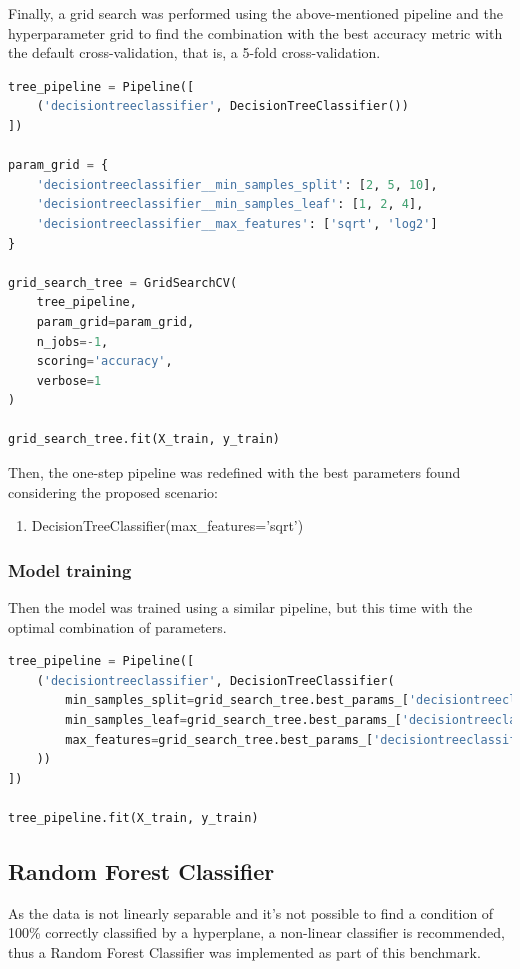 \documentclass{article}
\begin{document}
Finally, a grid search was performed using the above-mentioned pipeline and the hyperparameter grid to find the combination with the best accuracy metric with the default cross-validation, that is, a 5-fold cross-validation.
\begin{lstlisting}[language=Python]
tree_pipeline = Pipeline([
    ('decisiontreeclassifier', DecisionTreeClassifier())
])

param_grid = {
    'decisiontreeclassifier__min_samples_split': [2, 5, 10],
    'decisiontreeclassifier__min_samples_leaf': [1, 2, 4],
    'decisiontreeclassifier__max_features': ['sqrt', 'log2']
}

grid_search_tree = GridSearchCV(
    tree_pipeline,
    param_grid=param_grid,
    n_jobs=-1,
    scoring='accuracy',
    verbose=1
)

grid_search_tree.fit(X_train, y_train)
\end{lstlisting}

Then, the one-step pipeline was redefined with the best parameters found considering the proposed scenario:
\begin{enumerate}    
    \item DecisionTreeClassifier(max\_features='sqrt')
\end{enumerate}

\subsubsection{Model training}
Then the model was trained using a similar pipeline, but this time with the optimal combination of parameters.

\begin{lstlisting}[language=Python]
tree_pipeline = Pipeline([
    ('decisiontreeclassifier', DecisionTreeClassifier(
        min_samples_split=grid_search_tree.best_params_['decisiontreeclassifier__min_samples_split'],
        min_samples_leaf=grid_search_tree.best_params_['decisiontreeclassifier__min_samples_leaf'],
        max_features=grid_search_tree.best_params_['decisiontreeclassifier__max_features']
    ))
])

tree_pipeline.fit(X_train, y_train)
\end{lstlisting}

\subsection{Random Forest Classifier} 
As the data is not linearly separable and it's not possible to find a condition of 100\% correctly classified by a hyperplane, a non-linear classifier is recommended, thus a Random Forest Classifier was implemented as part of this benchmark.
\end{document}
